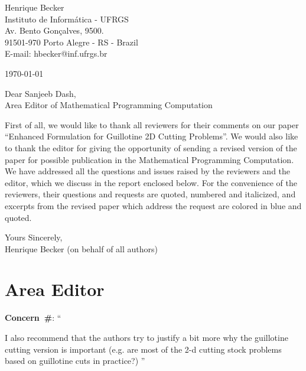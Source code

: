 \documentclass[smallextended]{svjour3}       %
\makeatletter
\newcommand\gobblepars{%
    \@ifnextchar\par%
        {\expandafter\gobblepars\@gobble}%
        {}}
\newcounter{concern}
\newenvironment{concern}{%
    \refstepcounter{concern}\par\smallskip\noindent%
    \textbf{Concern~\#\theconcern}: ``\itshape\gobblepars}%
    {\unskip''\smallskip}
\makeatother
\begin{document}
\pagestyle{empty}

\vspace{2cm}

\begin{flushright}
   \begin{minipage}{7cm}
      Henrique Becker \\
      Instituto de Informática - UFRGS \\
      Av. Bento Gonçalves, 9500. \\
      91501-970 Porto Alegre - RS - Brazil \\
      E-mail: hbecker@inf.ufrgs.br \\
   \end{minipage}
\end{flushright}

\begin{flushleft}
\today

\vspace{1.5cm}

Dear Sanjeeb Dash,\\
Area Editor of Mathematical Programming Computation
\end{flushleft}

\bigskip
First of all, we would like to thank all reviewers for their comments on our paper ``Enhanced Formulation for Guillotine 2D Cutting Problems''.
We would also like to thank the editor for giving the opportunity of sending a revised version of the paper for possible publication in the Mathematical Programming Computation.
We have addressed all the questions and issues raised by the reviewers and the editor, which we discuss in the report enclosed below.
For the convenience of the reviewers, their questions and requests are quoted, numbered and italicized, and excerpts from the revised paper which address the request are colored in blue and quoted.

\bigskip

\begin{flushleft}
Yours Sincerely,\\
Henrique Becker (on behalf of all authors)
\end{flushleft}

\newpage

\section{Area Editor}

\begin{concern}
I also recommend that the authors try to justify a bit more why the guillotine cutting version is important (e.g. are most of the 2-d cutting stock problems based on guillotine cuts in practice?)\label{con:justify_problem_importance}
\end{concern}
\end{document}
